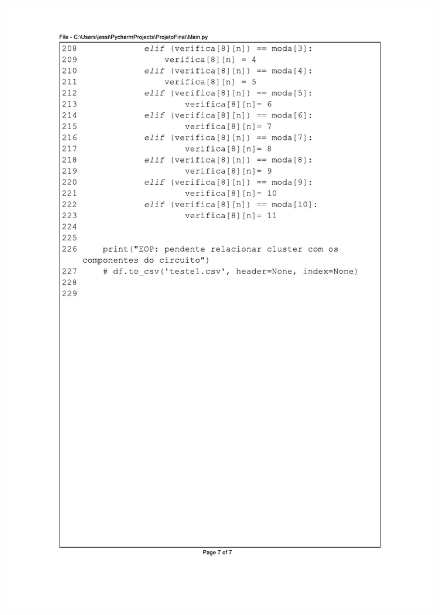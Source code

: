 \begin{figure}[H]
\centering
\includegraphics[scale=0.9]{01_Pre_textuais/code/main7.pdf}
\end{figure}



